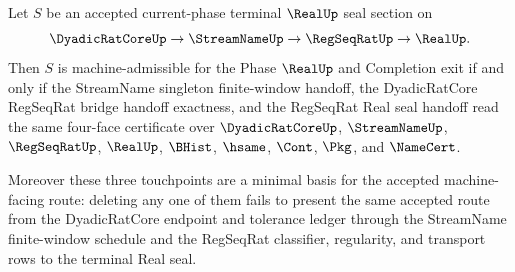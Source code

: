 \begin{theorem}
\label{thm:real-four-face-machine-touchpoint-minimality}
Let $S$ be an accepted current-phase terminal $\RealUp$ seal section on
$$
\DyadicRatCoreUp \to \StreamNameUp \to \RegSeqRatUp \to \RealUp .
$$
Then $S$ is machine-admissible for the Phase $\RealUp$ and Completion exit if and only if the StreamName singleton finite-window handoff, the DyadicRatCore RegSeqRat bridge handoff exactness, and the RegSeqRat Real seal handoff read the same four-face certificate over $\DyadicRatCoreUp$, $\StreamNameUp$, $\RegSeqRatUp$, $\RealUp$, $\BHist$, $\hsame$, $\Cont$, $\Pkg$, and $\NameCert$.

Moreover these three touchpoints are a minimal basis for the accepted machine-facing route: deleting any one of them fails to present the same accepted route from the DyadicRatCore endpoint and tolerance ledger through the StreamName finite-window schedule and the RegSeqRat classifier, regularity, and transport rows to the terminal Real seal.
\end{theorem}
